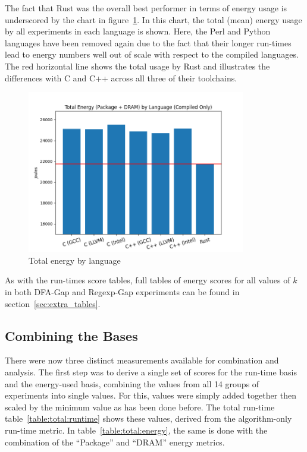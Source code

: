 The fact that Rust was the overall best performer in terms of energy usage is underscored by the chart in figure~\ref{fig:graph:total_power_usage}. In this chart, the total (mean) energy usage by all experiments in each language is shown. Here, the Perl and Python languages have been removed again due to the fact that their longer run-times lead to energy numbers well out of scale with respect to the compiled languages. The red horizontal line shows the total usage by Rust and illustrates the differences with C and C++ across all three of their toolchains.

\begin{figure}[h]
	\centering
    \includegraphics[width=0.85\textwidth]{figures/total_power_usage.png}
    \caption{Total energy by language}
    \label{fig:graph:total_power_usage}
\end{figure}

As with the run-times score tables, full tables of energy scores for all values of $k$ in both DFA-Gap and Regexp-Gap experiments can be found in section~\ref{sec:extra_tables}.

\subsection{Combining the Bases}
\label{subsec:combined}

There were now three distinct measurements available for combination and analysis. The first step was to derive a single set of scores for the run-time basis and the energy-used basis, combining the values from all 14 groups of experiments into single values. For this, values were simply added together then scaled by the minimum value as has been done before. The total run-time table~\ref{table:total:runtime} shows these values, derived from the algorithm-only run-time metric. In table~\ref{table:total:energy}, the same is done with the combination of the ``Package'' and ``DRAM'' energy metrics.

